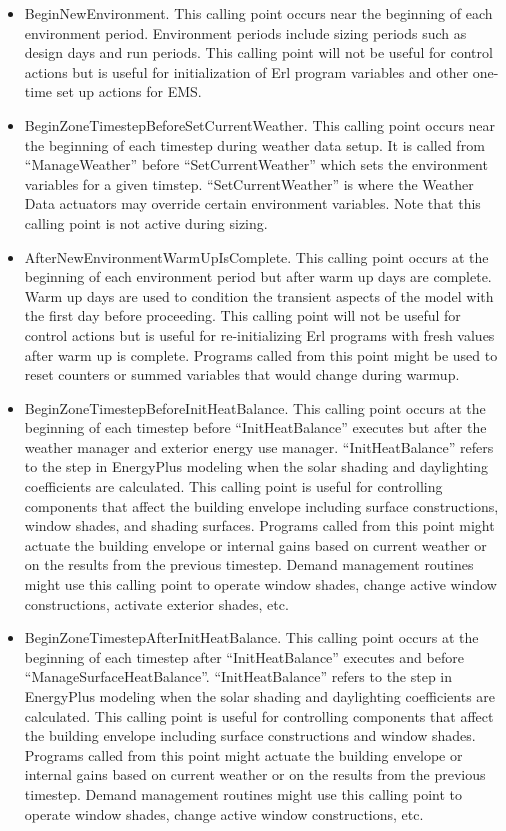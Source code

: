 \begin{itemize}
\item
  BeginNewEnvironment. This calling point occurs near the beginning of each environment period. Environment periods include sizing periods such as design days and run periods. This calling point will not be useful for control actions but is useful for initialization of Erl program variables and other one-time set up actions for EMS.
\item
  BeginZoneTimestepBeforeSetCurrentWeather. This calling point occurs near the beginning of each timestep during weather data setup. It is called from ``ManageWeather'' before ``SetCurrentWeather'' which sets the environment variables for a given timstep. ``SetCurrentWeather'' is where the Weather Data actuators may override certain environment variables. Note that this calling point is not active during sizing.
\item
  AfterNewEnvironmentWarmUpIsComplete. This calling point occurs at the beginning of each environment period but after warm up days are complete. Warm up days are used to condition the transient aspects of the model with the first day before proceeding. This calling point will not be useful for control actions but is useful for re-initializing Erl programs with fresh values after warm up is complete. Programs called from this point might be used to reset counters or summed variables that would change during warmup.
\item
  BeginZoneTimestepBeforeInitHeatBalance. This calling point occurs at the beginning of each timestep before ``InitHeatBalance'' executes but after the weather manager and exterior energy use manager. ``InitHeatBalance'' refers to the step in EnergyPlus modeling when the solar shading and daylighting coefficients are calculated. This calling point is useful for controlling components that affect the building envelope including surface constructions, window shades, and shading surfaces. Programs called from this point might actuate the building envelope or internal gains based on current weather or on the results from the previous timestep. Demand management routines might use this calling point to operate window shades, change active window constructions, activate exterior shades, etc.

\item
  BeginZoneTimestepAfterInitHeatBalance. This calling point occurs at the beginning of each timestep after ``InitHeatBalance'' executes and before ``ManageSurfaceHeatBalance''. ``InitHeatBalance'' refers to the step in EnergyPlus modeling when the solar shading and daylighting coefficients are calculated. This calling point is useful for controlling components that affect the building envelope including surface constructions and window shades. Programs called from this point might actuate the building envelope or internal gains based on current weather or on the results from the previous timestep. Demand management routines might use this calling point to operate window shades, change active window constructions, etc.


\end{itemize}
